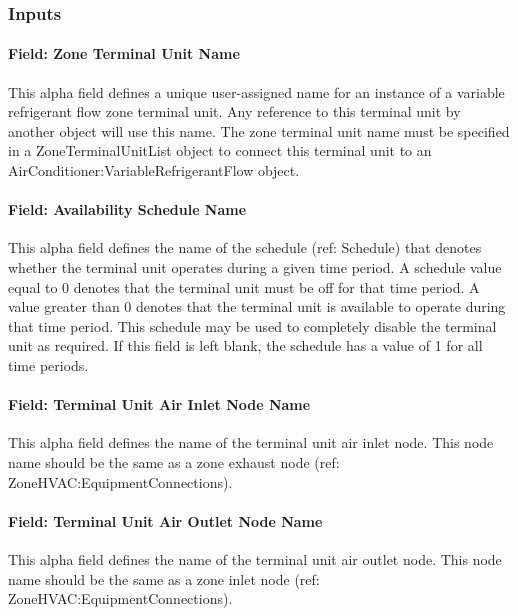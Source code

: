 \subsubsection{Inputs}\label{inputs-14-018}

\paragraph{Field: Zone Terminal Unit Name}\label{field-zone-terminal-unit-name}

This alpha field defines a unique user-assigned name for an instance of a variable refrigerant flow zone terminal unit. Any reference to this terminal unit by another object will use this name. The zone terminal unit name must be specified in a ZoneTerminalUnitList object to connect this terminal unit to an AirConditioner:VariableRefrigerantFlow object.

\paragraph{Field: Availability Schedule Name}\label{field-availability-schedule-name-13-001}

This alpha field defines the name of the schedule (ref: Schedule) that denotes whether the terminal unit operates during a given time period. A schedule value equal to 0 denotes that the terminal unit must be off for that time period. A value greater than 0 denotes that the terminal unit is available to operate during that time period. This schedule may be used to completely disable the terminal unit as required. If this field is left blank, the schedule has a value of 1 for all time periods.

\paragraph{Field: Terminal Unit Air Inlet Node Name}\label{field-terminal-unit-air-inlet-node-name}

This alpha field defines the name of the terminal unit air inlet node. This node name should be the same as a zone exhaust node (ref: ZoneHVAC:EquipmentConnections).

\paragraph{Field: Terminal Unit Air Outlet Node Name}\label{field-terminal-unit-air-outlet-node-name}

This alpha field defines the name of the terminal unit air outlet node. This node name should be the same as a zone inlet node (ref: ZoneHVAC:EquipmentConnections).


